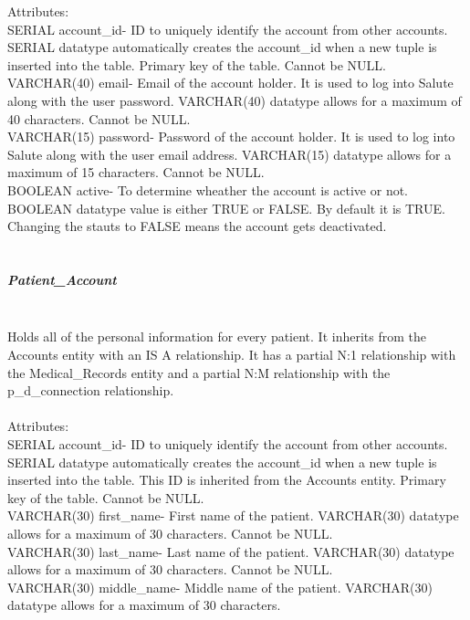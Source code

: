 \documentclass[12pt]{report}
\begin{document}
Attributes:\\
SERIAL account_id- ID to uniquely identify the account from other accounts. SERIAL datatype automatically creates the account_id when a new tuple is inserted into the table.  Primary key of the table.  Cannot be NULL.\\

VARCHAR(40) email- Email of the account holder. It is used to log into Salute along with the user password.  VARCHAR(40) datatype allows for a maximum of 40 characters.  Cannot be NULL.\\

VARCHAR(15) password-  Password of the account holder.  It is used to log into Salute along with the user email address.  VARCHAR(15) datatype allows for a maximum of 15 characters.  Cannot be NULL.\\

BOOLEAN active- To determine wheather the account is active or not.  BOOLEAN datatype value is either TRUE or FALSE.  By default it is TRUE.  Changing the stauts to FALSE means the account gets deactivated.\\  \\

\subparagraph{Patient_Account}\\
Holds all of the personal information for every patient.  It inherits from the Accounts entity with an IS A relationship.  It has a partial N:1 relationship with the Medical_Records entity and a partial N:M relationship with the p_d_connection relationship.\\ \\

Attributes:\\
SERIAL account_id- ID to uniquely identify the account from other accounts. SERIAL datatype automatically creates the account_id when a new tuple is inserted into the table.  This ID is inherited from the Accounts entity. Primary key of the table.  Cannot be NULL.\\

VARCHAR(30) first_name-  First name of the patient.  VARCHAR(30) datatype allows for a maximum of 30 characters.  Cannot be NULL.\\

VARCHAR(30) last_name- Last name of the patient.  VARCHAR(30) datatype allows for a maximum of 30 characters.  Cannot be NULL.\\ 

VARCHAR(30) middle_name- Middle name of the patient. VARCHAR(30) datatype allows for a maximum of 30 characters.\\
\end{document}
